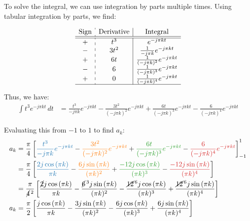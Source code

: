 \documentclass[a4paper, 10pt]{article}
\begin{document}
\begin{solution}
To solve the integral, we can use integration by parts multiple times.
Using tabular integration by parts, we find:

\renewcommand{\arraystretch}{1.7}
\[
\begin{array}{c:c|c}
    \text{Sign} & \text{Derivative} & \text{Integral} \\
    \hline
    \hline
    + & t^3 & e^{-j \pi k t} \\
    - & 3t^2 & \frac{1}{-j \pi k} e^{-j \pi k t} \\
    + & 6t & \frac{1}{(-j \pi k)^2} e^{-j \pi k t} \\
    - & 6 & \frac{1}{(-j \pi k)^3} e^{-j \pi k t} \\
    + & 0 & \frac{1}{(-j \pi k)^4} e^{-j \pi k t} \\
    \hline
\end{array}
\]

Thus, we have:
\begin{align*}
    \int t^3 e^{-j \pi k t} \,dt &= \frac{t^3}{-j \pi k} e^{-j \pi k t} - \frac{3t^2}{(-j \pi k)^2} e^{-j \pi k t} + \frac{6t}{(-j \pi k)^3} e^{-j \pi k t} - \frac{6}{(-j \pi k)^4} e^{-j \pi k t}
\end{align*}

Evaluating this from \( -1 \) to \( 1 \) to find \( a_k \):
\begin{align*}
    a_k &= \frac{\pi}{4} \sqbracket{ \textcolor[HTML]{1F77B4}{ \frac{t^3}{-j \pi k} e^{-j \pi k t} } - \textcolor[HTML]{FF7F0E}{ \frac{3t^2}{(-j \pi k)^2} e^{-j \pi k t} } + \textcolor[HTML]{2CA02C}{ \frac{6t}{(-j \pi k)^3} e^{-j \pi k t} } - \textcolor[HTML]{D62728}{ \frac{6}{(-j \pi k)^4} e^{-j \pi k t} } }_{-1}^{1} \\
    &= \frac{\pi}{4} \sqbracket{ \textcolor[HTML]{1F77B4}{ \frac{2j\cos{(\pi k)}}{\pi k} } - \textcolor[HTML]{FF7F0E}{ \frac{6j \sin{(\pi k)} }{(\pi k)^2} } + \textcolor[HTML]{2CA02C}{ \frac{-12j \cos{(\pi k)}}{(\pi k)^3} } - \textcolor[HTML]{D62728}{ \frac{-12j\sin{(\pi k)}}{(\pi k)^4} } } \\
    &= \frac{\pi}{\cancel{4}^{\, 2}} \sqbracket{ \frac{\cancel{2}j\cos{(\pi k)}}{\pi k} - \frac{\cancel{6}^{\, 3}j \sin{(\pi k)} }{(\pi k)^2} - \frac{\cancel{12}^{\, 6}j \cos{(\pi k)}}{(\pi k)^3} + \frac{\cancel{12}^{\, 6}j \sin{(\pi k)}}{(\pi k)^4} } \\
    a_k &= \frac{\pi}{2} \sqbracket{ \frac{j \cos{(\pi k)}}{\pi k} - \frac{3 j \sin{(\pi k)} }{(\pi k)^2} - \frac{6 j \cos{(\pi k)}}{(\pi k)^3} + \frac{6 j \sin{(\pi k)}}{(\pi k)^4} }
\end{align*}


\end{solution}
\end{document}
